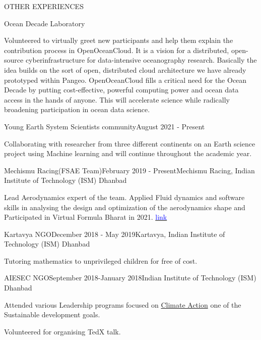 \documentclass{resume} %
\begin{document}
\begin{rSection}{OTHER EXPERIENCES}
\begin{rSubsection}{Ocean Decade Laboratory}{}{}
\item Volunteered to virtually greet new participants and help them explain the contribution process in OpenOceanCloud. It is a vision for a distributed, open-source cyberinfrastructure for data-intensive oceanography research. Basically the idea builds on the sort of open, distributed cloud architecture we have already prototyped within Pangeo. OpenOceanCloud fills a critical need for the Ocean Decade by putting cost-effective, powerful computing power and ocean data access in the hands of anyone. This will accelerate science while radically broadening participation in ocean data science. 
\end{rSubsection}
\begin{rSubsection}{Young Earth System Scientists community}{August 2021 - Present}{}
\item Collaborating with researcher from three different continents on an Earth science project using Machine learning and will continue throughout the academic year. 
\end{rSubsection}
\begin{rSubsection}{Mechismu Racing(FSAE Team)}{February 2019 - Present}{Mechismu Racing, Indian Institute of Technology (ISM) Dhanbad}
\item Lead Aerodynamics expert of the team. Applied Fluid dynamics and software skills in analysing the design and optimization of the aerodynamics shape and Participated in Virtual Formula Bharat in 2021. 
\href{https://drive.google.com/file/d/1gxg4ES_sFsu9u8YnKFnXOZkrpout1oJu/view?usp=sharing}{\textcolor{blue}{link}}

\end{rSubsection}

\begin{rSubsection}{Kartavya NGO}{December 2018 - May 2019}{Kartavya, Indian Institute of Technology (ISM) Dhanbad}
\item Tutoring mathematics to unprivileged children for free of cost. 
\end{rSubsection}

\begin{rSubsection}{AIESEC NGO}{September 2018-January 2018}{Indian Institute of Technology (ISM) Dhanbad}
\item Attended various Leadership programs focused on \underline{Climate Action} one of the Sustainable development goals.
\item Volunteered for organising TedX talk. 
\end{rSubsection}

\end{rSection}
\end{document}

